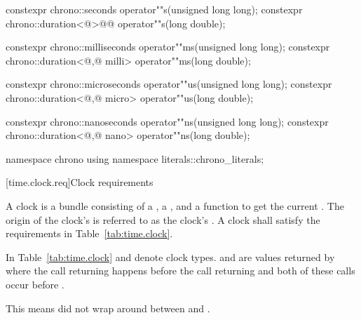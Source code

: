 \begin{codeblock}
{{{    constexpr chrono::seconds               operator""s(unsigned long long);
    constexpr chrono::duration<@\unspec@>@\itcorr[-1]@ operator""s(long double);

    constexpr chrono::milliseconds                 operator""ms(unsigned long long);
    constexpr chrono::duration<@\unspec,@ milli> operator""ms(long double);

    constexpr chrono::microseconds                 operator""us(unsigned long long);
    constexpr chrono::duration<@\unspec,@ micro> operator""us(long double);

    constexpr chrono::nanoseconds                 operator""ns(unsigned long long);
    constexpr chrono::duration<@\unspec,@ nano> operator""ns(long double);
  }
  }

  namespace chrono {
    using namespace literals::chrono_literals;
  }
}
\end{codeblock}

[time.clock.req]{Clock requirements}

\pnum
A clock is a bundle consisting of a , a
, and a function  to get the current .
The origin of the clock's  is referred to as the clock's .
 A clock shall satisfy the requirements in Table~\ref{tab:time.clock}.

\pnum
In Table~\ref{tab:time.clock}  and  denote clock types.  and
 are values returned by  where the call returning  happens
before the call returning  and both of these calls
occur
before .
\begin{note} This means  did not wrap around between  and
. \end{note}


